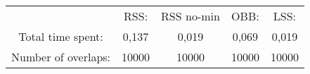 \begin{tabular}{c|c|c|c|c}\\ 
& RSS: & RSS no-min & OBB: & LSS:\\ 
Total time spent: & 0,137 & 0,019 & 0,069 & 0,019\\ 
Number of overlaps: &10000 & 10000 & 10000 & 10000\\ 
\end{tabular}